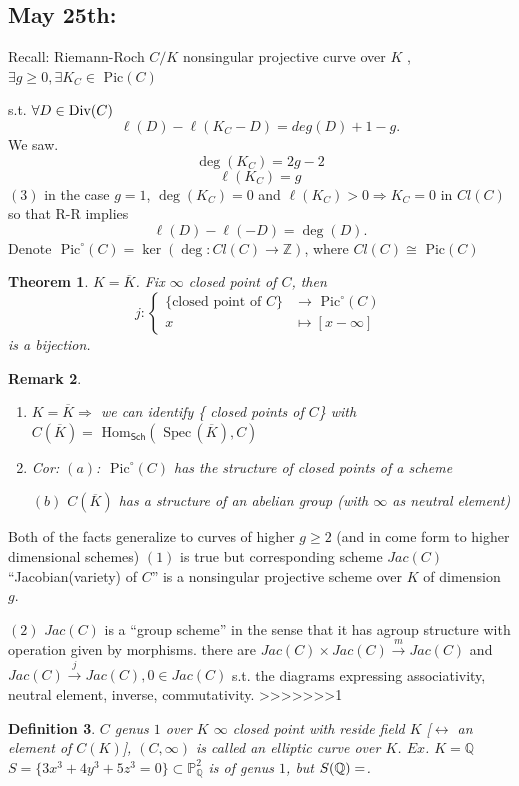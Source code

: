 \documentclass[11pt]{article}
\newtheorem{thm}{Theorem}[section]
\newtheorem{dfn}[thm]{Definition}
\newtheorem{rmk}[thm]{Remark}
\renewcommand{\hom}{\text{ Hom}}
\newcommand{\pic}{\text{ Pic}}
\newcommand{\spec}{\text{ Spec}\,}
\newcommand{\proj}{\mathbb P}
\newcommand{\intg}{\mathbb Z}
\newcommand{\ratl}{\mathbb Q}
\newcommand{\Div}{\textnormal{Div}}
\newcommand{\Lrta}{\Longrightarrow}
\newcommand{\lrta}{\longrightarrow}
\newcommand{\llrta}{\longleftrightarrow}
\begin{document}
\subsection{May 25th:}

Recall:
Riemann-Roch $C/K$ nonsingular projective curve over $K$ , $\exists g\geq 0,\exists K_C\in  \pic(C)$

s.t. $\forall D\in \Div(C)$
$$
\ell(D)-\ell (K_C-D)=deg(D)+1-g.
$$
We saw. 
$$
\deg(K_C)=2g-2
$$
$$
\ell(K_C)=g
$$
$(3)$ in the case  $g=1$, $\deg(K_C)=0$ and $\ell(K_C)>0\Lrta K_C=0$ in $Cl(C)$ so that R-R
implies
$$
\ell(D)-\ell(-D)=\deg(D).
$$
Denote $\pic^\circ(C)=\ker(\deg:Cl(C)\lrta\intg)$, where $Cl(C)\cong \pic (C)$
\begin{thm}
$K=\overline{K}$. Fix $\infty$ closed point of $C$, then 
$$
j:\left\{\begin{aligned}
\{\text{closed point of $C$}\}&\lrta\pic^\circ(C)\\
x & \longmapsto [x-\infty]
\end{aligned}\right.
$$
is a bijection.

\end{thm}
\begin{rmk}
\begin{enumerate}[label=(\arabic*)]
\item $K=\overline{K}\Lrta $ we can identify \{ closed points of $C$\} with 
$C(\overline{K})=\hom_{\mathsf{Sch}}(\spec(\overline{K}),C)$
\item Cor: $(a)$: $\pic^\circ(C)$ has the structure of closed points of a scheme

$(b)$ $C(\overline{K})$ has  a structure of an abelian group (with $\infty$ as neutral element)
\end{enumerate}
\end{rmk}
Both of the facts generalize to curves of higher $g\geq 2$ (and in come form to higher dimensional schemes) $(1)$ is true but corresponding scheme $Jac(C)$ ``Jacobian(variety) of  $C$'' is a nonsingular projective scheme over $K$ of dimension $g$.

$(2)$ $Jac(C)$ is a ``group scheme'' in the sense that it has agroup structure with operation given by morphisms. there are $Jac(C)\times Jac(C)\overset{m}{\lrta} Jac(C)$ and $Jac(C)\overset{j}{\lrta}Jac(C), 0\in Jac(C)$ s.t. the diagrams expressing associativity, neutral element, inverse, commutativity.
>>>>>>>1

\begin{dfn}
 $C$ genus $1$ over $K$ $\infty$ closed point with reside field $K$ [$\llrta$ an  element of $C(K)$], $(C,\infty)$ is called an elliptic curve over $K$. $Ex$. $K=\ratl$ $S=\{3x^3+4y^3+5z^3=0\}\subset \proj^2_\ratl$  is of genus $1$, but $S(\ratl)=\empty$.
\end{dfn}
\end{document}
